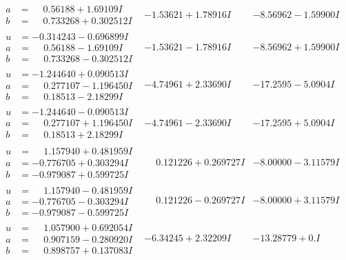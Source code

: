 \documentclass[1p]{elsarticle_modified}
\theoremstyle{definition}
\begin{document}
$$\begin{array}{c|c|c}
\begin{aligned}
a &= \phantom{-}0.56188 + 1.69109 I \\
b &= \phantom{-}0.733268 + 0.302512 I\end{aligned}
 & -1.53621 + 1.78916 I & -8.56962 - 1.59900 I \\ \hline\begin{aligned}
u &= -0.314243 - 0.696899 I \\
a &= \phantom{-}0.56188 - 1.69109 I \\
b &= \phantom{-}0.733268 - 0.302512 I\end{aligned}
 & -1.53621 - 1.78916 I & -8.56962 + 1.59900 I \\ \hline\begin{aligned}
u &= -1.244640 + 0.090513 I \\
a &= \phantom{-}0.277107 - 1.196450 I \\
b &= \phantom{-}0.18513 - 2.18299 I\end{aligned}
 & -4.74961 + 2.33690 I & -17.2595 - 5.0904 I \\ \hline\begin{aligned}
u &= -1.244640 - 0.090513 I \\
a &= \phantom{-}0.277107 + 1.196450 I \\
b &= \phantom{-}0.18513 + 2.18299 I\end{aligned}
 & -4.74961 - 2.33690 I & -17.2595 + 5.0904 I \\ \hline\begin{aligned}
u &= \phantom{-}1.157940 + 0.481959 I \\
a &= -0.776705 + 0.303294 I \\
b &= -0.979087 + 0.599725 I\end{aligned}
 & \phantom{-}0.121226 + 0.269727 I & -8.00000 - 3.11579 I \\ \hline\begin{aligned}
u &= \phantom{-}1.157940 - 0.481959 I \\
a &= -0.776705 - 0.303294 I \\
b &= -0.979087 - 0.599725 I\end{aligned}
 & \phantom{-}0.121226 - 0.269727 I & -8.00000 + 3.11579 I \\ \hline\begin{aligned}
u &= \phantom{-}1.057900 + 0.692054 I \\
a &= \phantom{-}0.907159 - 0.280920 I \\
b &= \phantom{-}0.898757 + 0.137083 I\end{aligned}
 & -6.34245 + 2.32209 I & -13.28779 + 0. I\phantom{ +0.000000I} \\ \hline\begin{aligned}

\end{aligned}
\end{array}$$
\end{document}
